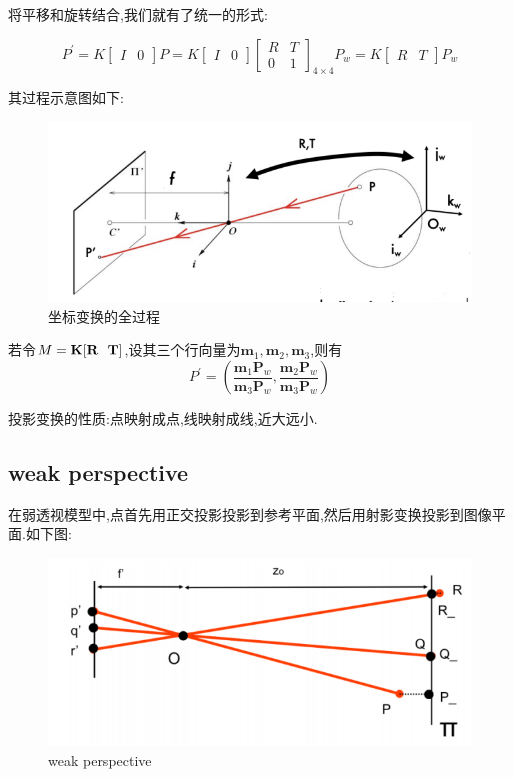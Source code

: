 将平移和旋转结合,我们就有了统一的形式:

\begin{equation}
	P^{\prime}=K\left[\begin{array}{ll}
		I & 0
	\end{array}\right] P=K\left[\begin{array}{ll}
		I & 0
	\end{array}\right]\left[\begin{array}{ll}
		R & T \\
		0 & 1
	\end{array}\right]_{4 \times 4} P_{w}=K\left[\begin{array}{ll}
		R & T
	\end{array}\right] P_{w}
\end{equation}

其过程示意图如下:

\begin{figure}[htbp]
	\centering
	\includegraphics[scale=0.75]{figures/transform_all.png}
	\caption{坐标变换的全过程}
\end{figure}

若令$M = \bold{K}[\bold{R} \ \ \bold{T}]$,设其三个行向量为$\bm m_1, \bm m_2, \bm m_3$,则有
\begin{equation}
	P^\prime = \left(\frac{\bm{m}_{1} \bm P_{w}}{\bm{m}_{3} \bm P_{w}}, \frac{\bm{m}_{2} \bm P_{w}}{\bm{m}_{3} \bm P_{w}}\right)
\end{equation}

投影变换的性质:点映射成点,线映射成线,近大远小.

\subsection{weak perspective}

在弱透视模型中,点首先用正交投影投影到参考平面,然后用射影变换投影到图像平面.如下图:

\begin{figure}[htbp]
	\centering
	\includegraphics[scale=0.8]{figures/weak_perspective.png}
	\caption{weak perspective}
\end{figure}

